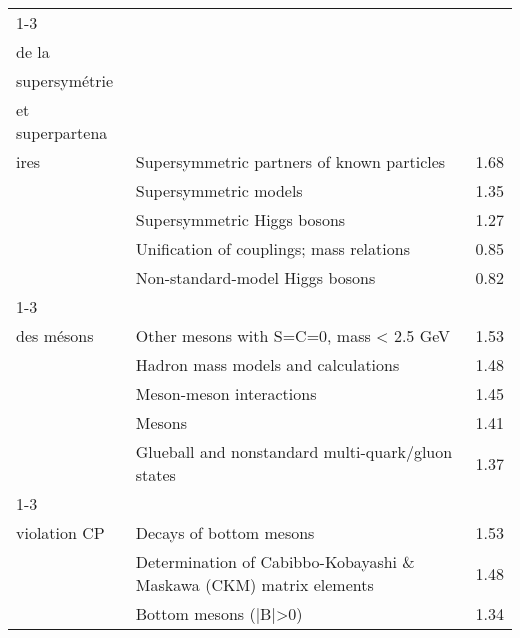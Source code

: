 \begin{longtable}[H]{p{}|p{}|p{}}
\cline{1-3}
\multirow{5}{*}{\begin{tabular}{l}Phénoménologie\\ de la\\ supersymétrie\\ et superpartena\\ ires\end{tabular}} & Supersymmetric partners of known particles &  1.68 \\
                                                                               & Supersymmetric models &  1.35 \\
                                                                               & Supersymmetric Higgs bosons &  1.27 \\
                                                                               & Unification of couplings; mass relations &  0.85 \\
                                                                               & Non-standard-model Higgs bosons &  0.82 \\
\cline{1-3}
\multirow{5}{*}{\begin{tabular}{l}Phénoménologie\\ des mésons\end{tabular}} & Other mesons with S=C=0, mass < 2.5 GeV &  1.53 \\
                                                                               & Hadron mass models and calculations &  1.48 \\
                                                                               & Meson-meson interactions &  1.45 \\
                                                                               & Mesons &  1.41 \\
                                                                               & Glueball and nonstandard multi-quark/gluon states &  1.37 \\
\cline{1-3}
\multirow{5}{*}{\begin{tabular}{l}Processus de\\ violation CP\end{tabular}} & Decays of bottom mesons &  1.53 \\
                                                                               & Determination of Cabibbo-Kobayashi \& Maskawa (CKM) matrix elements &  1.48 \\
                                                                               & Bottom mesons (|B|>0) &  1.34 \\

\end{longtable}
